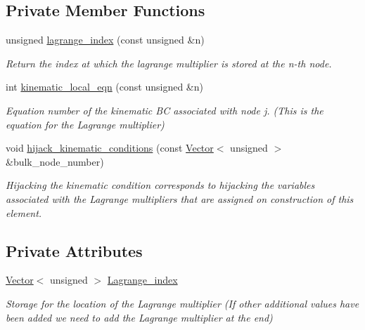\subsection*{Private Member Functions}
\begin{DoxyCompactItemize}
\item 
unsigned \hyperlink{classoomph_1_1ElasticUpdateFluidInterfaceElement_a2eb4fbe50ac4ff1e9b26e0e1d8ff3186}{lagrange\+\_\+index} (const unsigned \&n)
\begin{DoxyCompactList}\small\item\em Return the index at which the lagrange multiplier is stored at the n-\/th node. \end{DoxyCompactList}\item 
int \hyperlink{classoomph_1_1ElasticUpdateFluidInterfaceElement_a940840693906b7b8d619ff97f521c811}{kinematic\+\_\+local\+\_\+eqn} (const unsigned \&n)
\begin{DoxyCompactList}\small\item\em Equation number of the kinematic BC associated with node j. (This is the equation for the Lagrange multiplier) \end{DoxyCompactList}\item 
void \hyperlink{classoomph_1_1ElasticUpdateFluidInterfaceElement_ae82f486496a0647d905ab6ee857de0d0}{hijack\+\_\+kinematic\+\_\+conditions} (const \hyperlink{classoomph_1_1Vector}{Vector}$<$ unsigned $>$ \&bulk\+\_\+node\+\_\+number)
\begin{DoxyCompactList}\small\item\em Hijacking the kinematic condition corresponds to hijacking the variables associated with the Lagrange multipliers that are assigned on construction of this element. \end{DoxyCompactList}\end{DoxyCompactItemize}
\subsection*{Private Attributes}
\begin{DoxyCompactItemize}
\item 
\hyperlink{classoomph_1_1Vector}{Vector}$<$ unsigned $>$ \hyperlink{classoomph_1_1ElasticUpdateFluidInterfaceElement_a7852050a89e3aac51ed3693814be9018}{Lagrange\+\_\+index}
\begin{DoxyCompactList}\small\item\em Storage for the location of the Lagrange multiplier (If other additional values have been added we need to add the Lagrange multiplier at the end) \end{DoxyCompactList}\end{DoxyCompactItemize}
